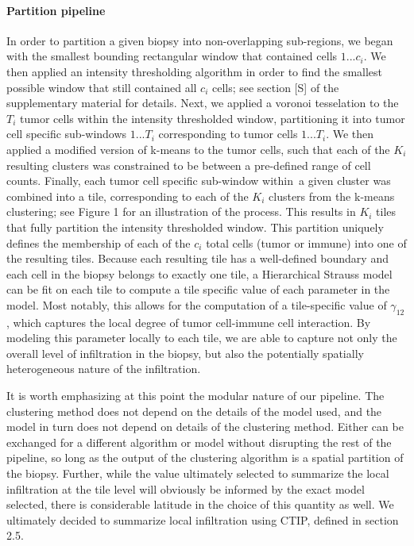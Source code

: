 \documentclass[
]{book}
\begin{document}
\paragraph{\textbf{Partition pipeline}}

In order to partition a given biopsy into non-overlapping
sub-regions, we began with the smallest bounding rectangular
window that contained cells \(1...c_i\). We then applied an
intensity thresholding algorithm in order to find the
smallest possible window that still contained all \(c_i\) cells;
see section {[}S{]} of the supplementary material for details.
Next, we applied a voronoi tesselation to the \(T_i\) tumor cells
within the intensity thresholded window, partitioning it into
tumor cell specific sub-windows \(1...T_i\) corresponding to tumor
cells \(1...T_i\). We then applied a modified version of k-means to
the tumor cells, such that each of the \(K_i\) resulting clusters
was constrained to be between a pre-defined range of cell counts.
Finally, each tumor cell specific sub-window within~a given
cluster was combined into a tile, corresponding to each of the
\(K_i\) clusters from the k-means clustering; see Figure 1 for
an illustration of the process. This results in \(K_i\)
tiles that fully partition the intensity thresholded window. This
partition uniquely defines the membership of each of the \(c_i\)
total cells (tumor or immune) into one of the resulting tiles.
Because each resulting tile has a well-defined boundary and
each cell in the biopsy belongs to exactly one tile, a
Hierarchical Strauss model can be fit on each tile to compute
a tile specific value of each parameter in the model. Most
notably, this allows for the computation of a tile-specific
value of \(\gamma_{12}\), which captures the local degree
of tumor cell-immune cell interaction. By modeling this
parameter locally to each tile, we are able to capture not
only the overall level of infiltration in the biopsy, but
also the potentially spatially heterogeneous nature of the
infiltration.

It is worth emphasizing at this point the modular nature of our
pipeline. The clustering method does not depend on the details
of the model used, and the model in turn does not depend on details
of the clustering method. Either can be exchanged for a different
algorithm or model without disrupting the rest of the pipeline,
so long as the output of the clustering algorithm is a spatial
partition of the biopsy. Further, while the value ultimately
selected to summarize the local infiltration at the tile level
will obviously be informed by the exact model selected, there
is considerable latitude in the choice of this quantity as well.
We ultimately decided to summarize local infiltration using
CTIP, defined in section 2.5.
\end{document}
